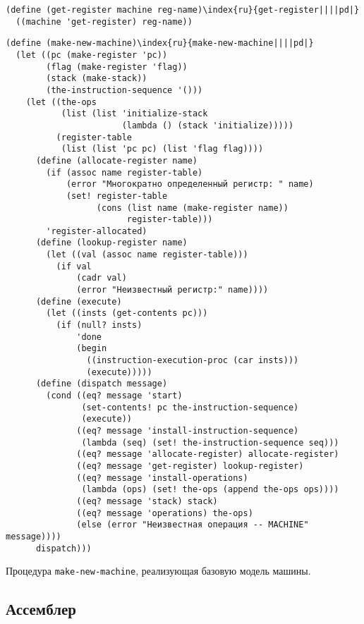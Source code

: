 \begin{Verbatim}[fontsize=\small]
(define (get-register machine reg-name)\index{ru}{get-register||||pd|}
  ((machine 'get-register) reg-name))
\end{Verbatim}


\begin{cntrfig}
{\small 
\begin{Verbatim}[fontsize=\small]
(define (make-new-machine)\index{ru}{make-new-machine||||pd|}
  (let ((pc (make-register 'pc))
        (flag (make-register 'flag))
        (stack (make-stack))
        (the-instruction-sequence '()))
    (let ((the-ops
           (list (list 'initialize-stack
                       (lambda () (stack 'initialize)))))
          (register-table
           (list (list 'pc pc) (list 'flag flag))))
      (define (allocate-register name)
        (if (assoc name register-table)
            (error "Многократно определенный регистр: " name)
            (set! register-table
                  (cons (list name (make-register name))
                        register-table)))
        'register-allocated)
      (define (lookup-register name)
        (let ((val (assoc name register-table)))
          (if val
              (cadr val)
              (error "Неизвестный регистр:" name))))
      (define (execute)
        (let ((insts (get-contents pc)))
          (if (null? insts)
              'done
              (begin
                ((instruction-execution-proc (car insts)))
                (execute)))))
      (define (dispatch message)
        (cond ((eq? message 'start)
               (set-contents! pc the-instruction-sequence)
               (execute))
              ((eq? message 'install-instruction-sequence)
               (lambda (seq) (set! the-instruction-sequence seq)))
              ((eq? message 'allocate-register) allocate-register)
              ((eq? message 'get-register) lookup-register)
              ((eq? message 'install-operations)
               (lambda (ops) (set! the-ops (append the-ops ops))))
              ((eq? message 'stack) stack)
              ((eq? message 'operations) the-ops)
              (else (error "Неизвестная операция -- MACHINE" message))))
      dispatch)))
\end{Verbatim}
}\caption{Процедура {\tt make-new-machine}, реализующая базовую модель
машины.}
\label{P5.13}

\end{cntrfig}

\subsection{Ассемблер}
\label{THE-ASSEMBLER}


